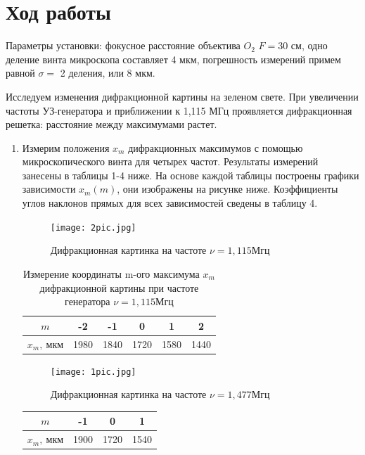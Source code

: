 \documentclass[a4paper,12pt]{article} %
\theoremstyle{plain} %
\theoremstyle{definition} %
\theoremstyle{remark} %
\begin{document}
\newpage

\section{Ход работы}
Параметры установки: фокусное расстояние объектива $  O_2  $ $ F = 30 $ см, одно деление винта микроскопа составляет 4 мкм, погрешность измерений примем равной  $ \sigma = $ 2 деления, или 8 мкм.

Исследуем изменения дифракционной картины на зеленом свете. При увеличении частоты УЗ-генератора и приближении к 1,115 МГц проявляется дифракционная решетка: расстояние между максимумами растет.

\begin{enumerate}
\item Измерим положения $ x_m $ дифракционных максимумов с помощью микроскопического винта для четырех частот. Результаты измерений занесены в таблицы 1-4 ниже. На основе каждой таблицы построены графики зависимости $ x_m (m) $, они изображены на рисунке ниже. Коэффициенты углов наклонов прямых для всех зависимостей сведены в таблицу 4.

\newline

\begin{figure}[H]
	\centering
	\texttt{[image: 2pic.jpg]}
	\caption{Дифракционная картинка на частоте $\nu=1,115 Мгц$}
	\label{5diff}
\end{figure}	

\begin{table}[!ht]
	\centering
	\begin{tabular}{|c|c|c|c|c|c|}
		\hline
		$m$ &-2&-1&0&1&2\\
		\hline
		$x_m, \ мкм$ &1980&1840& 1720&1580&1440\\
		\hline
	\end{tabular}
	\caption{Измерение координаты m-ого максимума $x_m$ дифракционной картины при частоте генератора $\nu=1,115 Мгц$}
\end{table}

\newline

\begin{figure}[H]
	\centering
	\texttt{[image: 1pic.jpg]}
	\caption{Дифракционная картинка на частоте $\nu=1,477 Мгц$}
	\label{3diff}
\end{figure}	

\begin{table}[!ht]
	\centering
	\begin{tabular}{|c|c|c|c|}
		\hline
		$m$ &-1&0&1\\
		\hline
		$x_m, \ мкм$ &1900&1720& 1540\\
		\hline


\end{tabular}
\end{table}
\end{enumerate}
\end{document}
